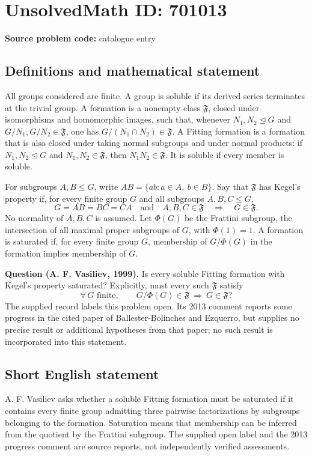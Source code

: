 \documentclass[11pt]{article}
\begin{document}
\section*{UnsolvedMath ID: 701013}
\textbf{Source problem code:} catalogue entry
\subsection{Definitions and mathematical statement}
All groups considered are finite. A group is soluble if its derived series terminates at the trivial group. A formation is a nonempty class \(\mathfrak F\), closed under isomorphisms and homomorphic images, such that, whenever \(N_1,N_2\unlhd G\) and \(G/N_1,G/N_2\in\mathfrak F\), one has \(G/(N_1\cap N_2)\in\mathfrak F\). A Fitting formation is a formation that is also closed under taking normal subgroups and under normal products: if \(N_1,N_2\unlhd G\) and \(N_1,N_2\in\mathfrak F\), then \(N_1N_2\in\mathfrak F\). It is soluble if every member is soluble.

For subgroups \(A,B\leq G\), write \(AB=\{ab:a\in A,\ b\in B\}\). Say that \(\mathfrak F\) has Kegel's property if, for every finite group \(G\) and all subgroups \(A,B,C\leq G\),
\[
G=AB=BC=CA\quad\text{and}\quad A,B,C\in\mathfrak F
\quad\Longrightarrow\quad G\in\mathfrak F.
\]
No normality of \(A,B,C\) is assumed. Let \(\Phi(G)\) be the Frattini subgroup, the intersection of all maximal proper subgroups of \(G\), with \(\Phi(1)=1\). A formation is saturated if, for every finite group \(G\), membership of \(G/\Phi(G)\) in the formation implies membership of \(G\).

\textbf{Question (A. F. Vasiliev, 1999).} Is every soluble Fitting formation with Kegel's property saturated? Explicitly, must every such \(\mathfrak F\) satisfy
\[
\forall\,G\text{ finite},\qquad
G/\Phi(G)\in\mathfrak F\ \Longrightarrow\ G\in\mathfrak F?
\]
The supplied record labels this problem open. Its 2013 comment reports some progress in the cited paper of Ballester-Bolinches and Ezquerro, but supplies no precise result or additional hypotheses from that paper; no such result is incorporated into this statement.
\subsection{Short English statement}
A. F. Vasiliev asks whether a soluble Fitting formation must be saturated if it contains every finite group admitting three pairwise factorizations by subgroups belonging to the formation. Saturation means that membership can be inferred from the quotient by the Frattini subgroup. The supplied open label and the 2013 progress comment are source reports, not independently verified assessments.
\end{document}
